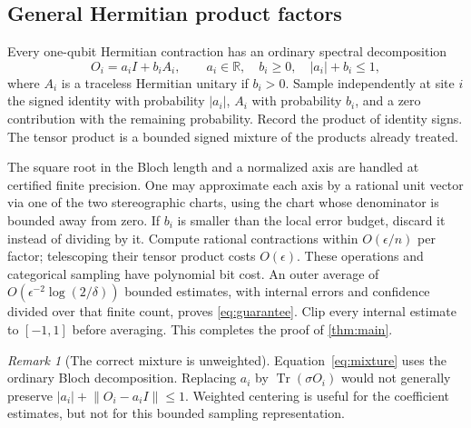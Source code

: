\documentclass[11pt,reqno]{amsart}
\numberwithin{equation}{section}
\theoremstyle{definition}
\theoremstyle{remark}
\newtheorem{remark}[theorem]{Remark}
\newcommand{\Tr}{\operatorname{Tr}}
\newcommand{\R}{\mathbb R}
\newcommand{\nn}[1]{\lVert#1\rVert}
\begin{document}
\subsection{General Hermitian product factors}
Every one-qubit Hermitian contraction has an ordinary spectral decomposition
\begin{equation}\label{eq:mixture}
 O_i=a_iI+b_iA_i,\qquad
 a_i\in\R,\quad b_i\geq0,\quad |a_i|+b_i\leq1,
\end{equation}
where $A_i$ is a traceless Hermitian unitary if $b_i>0$. Sample independently at site $i$ the signed identity with probability $|a_i|$, $A_i$ with probability $b_i$, and a zero contribution with the remaining probability. Record the product of identity signs. The tensor product is a bounded signed mixture of the products already treated.

The square root in the Bloch length and a normalized axis are handled at certified finite precision. One may approximate each axis by a rational unit vector via one of the two stereographic charts, using the chart whose denominator is bounded away from zero. If $b_i$ is smaller than the local error budget, discard it instead of dividing by it. Compute rational contractions within $O(\epsilon/n)$ per factor; telescoping their tensor product costs $O(\epsilon)$. These operations and categorical sampling have polynomial bit cost. An outer average of $O(\epsilon^{-2}\log(2/\delta))$ bounded estimates, with internal errors and confidence divided over that finite count, proves \eqref{eq:guarantee}. Clip every internal estimate to $[-1,1]$ before averaging. This completes the proof of \cref{thm:main}.

\begin{remark}[The correct mixture is unweighted]
Equation~\eqref{eq:mixture} uses the ordinary Bloch decomposition. Replacing $a_i$ by $\Tr(\sigma O_i)$ would not generally preserve $|a_i|+\nn{O_i-a_iI}\leq1$. Weighted centering is useful for the coefficient estimates, but not for this bounded sampling representation.
\end{remark}
\end{document}
